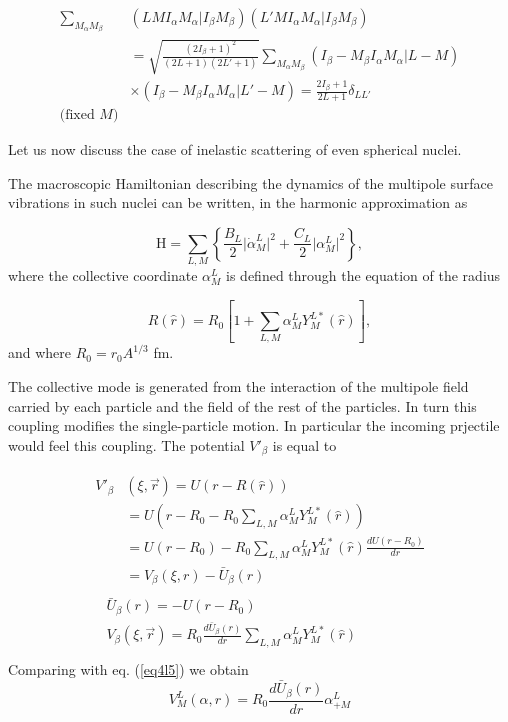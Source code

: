 \begin{subappendices}
\begin{equation}\label{eq4l10}
\begin{split}
\sum_{M_\alpha M_\beta}&(LMI_\alpha M_\alpha \vert I_\beta M_\beta)
 (L' M I_\alpha M_\alpha \vert I_\beta M_\beta)\\
& =\sqrt{\frac{(2 I_\beta+1)^2}{(2L+1)(2L'+1)}} \sum_{M_\alpha M_\beta}
(I_\beta -M_\beta  I_\alpha M_\alpha \vert L -M)\\
&\times(I_\beta -M_\beta  I_\alpha M_\alpha \vert L' -M)=\frac{2 I_\beta+1}{2 L+1} \delta_{L L'}\\
\text{(fixed $M$)}
\end{split}
\end{equation}


Let us now discuss the case of inelastic scattering of even spherical nuclei.


The macroscopic Hamiltonian describing the dynamics of the multipole surface vibrations in such nuclei can be written, in the harmonic approximation as

\begin{equation}\label{eq4l11}
\mathrm{H}=\sum_{L,M} \left\{ \frac{B_L}{2} \vert \dot{\alpha}_M^L \vert^2+
\frac{C_L}{2} \vert \alpha_M^L \vert^2 \right\},
\end{equation}
where the collective coordinate $\alpha_M^L$ is defined through the equation of the radius

\begin{equation}\label{eq4l12}
R(\hat r)= R_0 \left[1+\sum_{L,M} \alpha_M^L Y_M^{L*}(\hat r) \right],
\end{equation}
and where $R_0=r_0 A^{1/3}$ fm.



The collective mode is generated from the interaction of the multipole field carried by each particle and the field of the rest of the particles. In turn this coupling modifies the single-particle motion. In particular the incoming prjectile would feel this coupling. The potential $V'_\beta$ is equal to

\begin{align}\label{eq4l13}
\begin{split}
 V'_\beta & (\xi,\vec r)= U(r-R(\hat r))\\
& = U(r-R_0 -R_0\sum_{L,M} \alpha_M^L Y_M^{L*}(\hat r))\\
& = U(r-R_0) -R_0\sum_{L,M} \alpha_M^L Y_M^{L*}(\hat r) \frac{d U (r-R_0)}{d r}\\
& = V_\beta (\xi, r)- \bar{U}_\beta (r)
\end{split}\\\label{eq4l14}
\begin{split}
& \bar{U}_\beta (r)= -U(r-R_0)\\
& V_\beta (\xi,\vec r)=R_0 \frac{d \bar U_\beta (r)}{d r}\sum_{L,M} \alpha_M^L Y_M^{L*}(\hat r) \\
\end{split}
\end{align}
Comparing with eq. (\ref{eq4l5}) we obtain
\begin{equation}\label{eq4l15}
 V^L_M(\alpha,r)=R_0 \frac{d \bar U_\beta (r)}{d r} \alpha_{+M}^L
\end{equation}



\end{subappendices}
